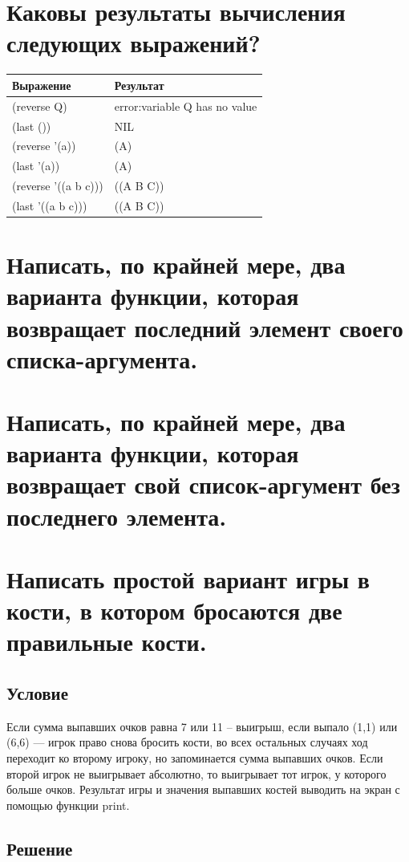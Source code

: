 \documentclass[a4paper,12pt]{article}
\begin{document}
	\section{Каковы результаты вычисления следующих выражений?}
	
	\begin{table} [h!]
		\begin{center}
			\begin{tabular}{|l|l|}
				\hline
				{\bf  Выражение} &    {\bf Результат} \\
				\hline
				{(reverse Q)} & error:variable Q has no value\\
				\hline
				{(last ())} & NIL\\
				\hline
				{(reverse '(a))} & (A)\\
				\hline
				{(last '(a))} & (A)\\
				\hline
				{(reverse '((a b c)))} & ((A B C))\\
				\hline
				{(last '((a b c)))} & ((A B C))\\
				\hline
			\end{tabular}  
			\label{m2}
		\end{center}
	\end{table}
	
	\section{Написать, по крайней мере, два варианта функции, которая возвращает последний элемент своего списка-аргумента.}
	
	\section{Написать, по крайней мере, два варианта функции, которая возвращает свой список-аргумент без последнего элемента.}
	
	\section{Написать простой вариант игры в кости, в котором бросаются две правильные кости. }
	
	\subsection{Условие}
	
	Если сумма выпавших очков равна 7 или 11 -- выигрыш, если выпало (1,1) или (6,6) --- игрок право снова бросить кости, во всех остальных случаях ход переходит ко второму игроку, но запоминается сумма выпавших очков. Если второй игрок не выигрывает абсолютно, то выигрывает тот игрок, у которого больше очков. Результат игры и значения выпавших костей выводить на экран с помощью функции print.
	
	\subsection{Решение}
	
	
	
\end{document}
